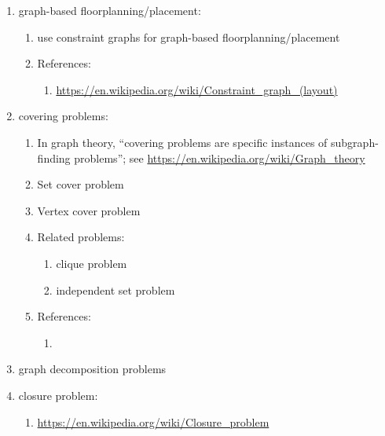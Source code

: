 \begin{enumerate}
\begin{enumerate}
	\end{enumerate}
\item graph-based floorplanning/placement: \vspace{-0.3cm}
	\begin{enumerate} \itemsep -2pt
	\item use constraint graphs for graph-based floorplanning/placement
	\item References: \vspace{-0.2cm}
		\begin{enumerate} \itemsep -2pt
		\item \url{https://en.wikipedia.org/wiki/Constraint_graph_(layout)}
		\end{enumerate}
	\end{enumerate}
\item covering problems: \vspace{-0.3cm}
	\begin{enumerate} \itemsep -2pt
	\item In graph theory, ``covering problems are specific instances of subgraph-finding problems''; see \url{https://en.wikipedia.org/wiki/Graph_theory}
	\item Set cover problem
	\item Vertex cover problem
	\item Related problems: \vspace{-0.2cm}
		\begin{enumerate} \itemsep -2pt
		\item clique problem
		\item independent set problem
		\end{enumerate}
	\item References: \vspace{-0.2cm}
		\begin{enumerate} \itemsep -2pt
		\item 
		\end{enumerate}
	\end{enumerate}
\item graph decomposition problems
\item closure problem: \vspace{-0.3cm}
	\begin{enumerate} \itemsep -2pt
	\item \url{https://en.wikipedia.org/wiki/Closure_problem}
	\end{enumerate}
\end{enumerate}





